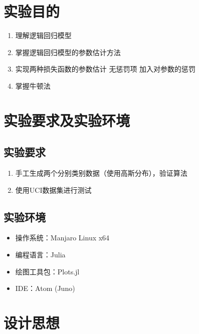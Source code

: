 \documentclass{ML}
\begin{document}
\maketitle

\tableofcontents
\newpage

\section{实验目的}

\begin{enumerate}
	\item 理解逻辑回归模型
	\item 掌握逻辑回归模型的参数估计方法
	\item 实现两种损失函数的参数估计
	      \subitem 无惩罚项
	      \subitem 加入对参数的惩罚
	\item 掌握牛顿法
\end{enumerate}

\section{实验要求及实验环境}

\subsection{实验要求}

\begin{enumerate}
	\item 手工生成两个分别类别数据（使用高斯分布），验证算法
	\item 使用UCI数据集进行测试
\end{enumerate}

\subsection{实验环境}

\begin{itemize}
	\item 操作系统：Manjaro Linux x64
	\item 编程语言：Julia
	\item 绘图工具包：Plots.jl
	\item IDE：Atom (Juno)
\end{itemize}

\section{设计思想}
\end{document}
